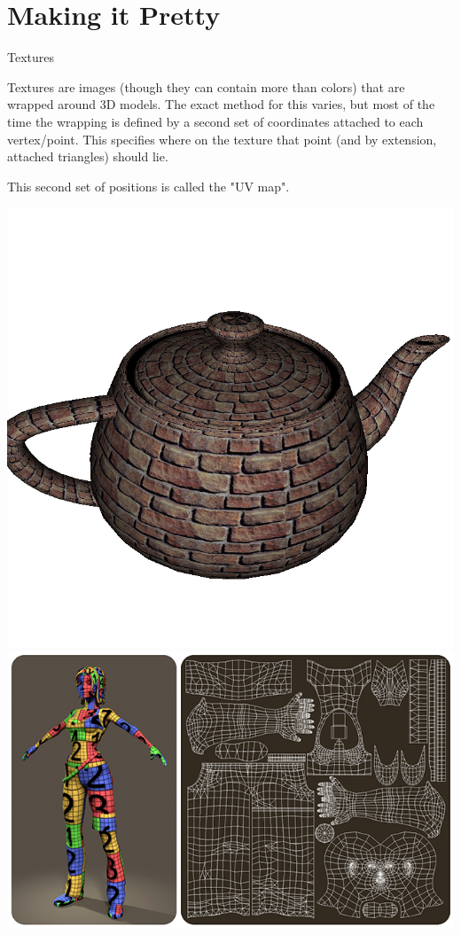 \documentclass{lug}
\newcommand{\splitslide}[4]{
    \noindent
    \begin{minipage}{#1 \textwidth - #2 }
        #3
    \end{minipage}%
    \hspace{ \dimexpr #2 * 2 \relax }%
    \begin{minipage}{\textwidth - #1 \textwidth - #2 }
        #4
    \end{minipage}
}
\begin{document}
\section{Making it Pretty}

\begin{frame}{Textures}
    \splitslide{0.65}{.7em}{
        \small

         Textures are images (though they can contain more than colors) that
         are wrapped around 3D models. The exact method for this varies, but
         most of the time the wrapping is defined by a second set of
         coordinates attached to each vertex/point. This specifies where on
         the texture that point (and by extension, attached triangles) should
         lie.

         \vspace{1ex}

         This second set of positions is called the "UV map".

    }{
        \includegraphics[width=\textwidth]{graphics/teapot_brick} \\
        \includegraphics[width=\textwidth]{graphics/uv_map}
    }
\end{frame}
\end{document}

